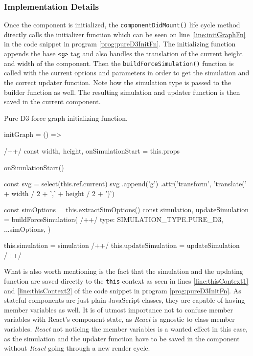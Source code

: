 \subsubsection{Implementation Details}

Once the component is initialized, the \texttt{componentDidMount()} life cycle method directly calls the initializer function which can be seen on line \ref{line:initGraphFn} in the code snippet in program \ref{prog:pureD3InitFn}. The initializing function appends the base \texttt{<g>} tag and also handles the translation of the current height and width of the component. Then the \texttt{buildForceSimulation()} function is called with the current options and parameters in order to get the simulation and the correct updater function. Note how the simulation type is passed to the builder function as well. The resulting simulation and updater function is then saved in the current component.

\begin{program}
\caption{Pure D3 force graph initializing function.}
\label{prog:pureD3InitFn}
\begin{JsCode}
initGraph = () => { /+\label{line:initGraphFn}+/
  const { width, height, onSimulationStart } = this.props

  onSimulationStart()

  const svg = select(this.ref.current)
  svg
    .append('g')
    .attr('transform', 'translate(' + width / 2 + ',' + height / 2 + ')')

  const simOptions = this.extractSimOptions()
  const { simulation, updateSimulation } = buildForceSimulation({ /+\label{line:buildForceSimulation}+/
    type: SIMULATION_TYPE.PURE_D3,
    ...simOptions,
  })

  this.simulation = simulation /+\label{line:thisContext1}+/
  this.updateSimulation = updateSimulation /+\label{line:thisContext2}+/
}
\end{JsCode}
\end{program}

What is also worth mentioning is the fact that the simulation and the updating function are saved directly to the \texttt{this} context as seen in lines \ref{line:thisContext1} and \ref{line:thisContext2} of the code snippet in program \ref{prog:pureD3InitFn}. As stateful components are just plain JavaScript classes, they are capable of having member variables as well. It is of utmost importance not to confuse member variables with React's component state, as \emph{React} is agnostic to class member variables. \emph{React} not noticing the member variables is a wanted effect in this case, as the simulation and the updater function have to be saved in the component without \emph{React} going through a new render cycle. 

